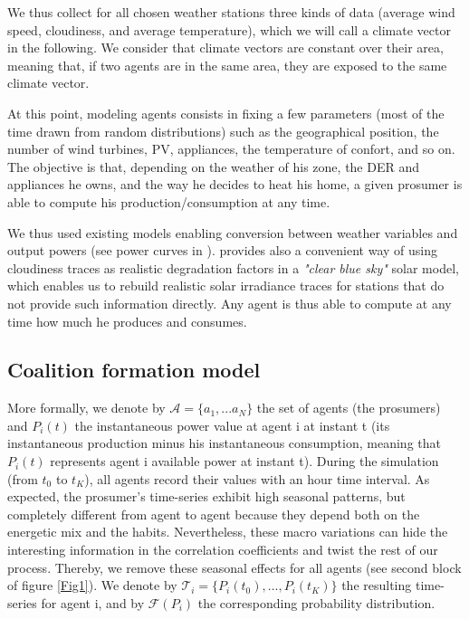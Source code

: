 \documentclass[conference]{IEEEtran}
\begin{document}
We thus collect for all chosen weather stations three kinds of data (average wind speed, cloudiness, and average temperature), which we will call a climate vector in the following. We consider that climate vectors are constant over their area, meaning that, if two agents are in the same area, they are exposed to the same climate vector.

At this point, modeling agents consists in fixing a few parameters (most of the time drawn from random distributions) such as the geographical position, the number of wind turbines, PV, appliances, the temperature of confort, and so on. The objective is that, depending on the weather of his zone, the DER and appliances he owns, and the way he decides to heat his home, a given prosumer is able to compute his production/consumption at any time. 

We thus used existing models enabling conversion between weather variables and output powers (see power curves in \cite{Kota2011} \cite{windturbinemodel}). \cite{Dans2007} provides also a convenient way of using cloudiness traces as realistic degradation factors in a \textit{"clear blue sky"} solar model, which enables us to rebuild realistic solar irradiance traces for stations that do not provide such information directly. Any agent is thus able to compute at any time how much he produces and consumes. 

\subsection{Coalition formation model}\label{subsec:Coalition}
More formally, we denote by $ \mathcal{A} = \{ a_{1},...a_{N} \} $ the set of agents (the prosumers) and $ P_{i}(t) $ the instantaneous power value at agent i at instant t (its instantaneous production minus his instantaneous consumption, meaning that $ P_{i}(t) $ represents agent i available power at instant t). During the simulation (from $t_{0} $ to $ t_{K} $), all agents record their values with an hour time interval. As expected, the prosumer's time-series exhibit high seasonal patterns, but completely different from agent to agent because they depend both on the energetic mix and the habits. Nevertheless, these macro variations can hide the interesting information in the correlation coefficients and twist the rest of our process. Thereby, we remove these seasonal effects for all agents (see second block of figure \ref{Fig1}). We denote by $ \mathcal{T}_{i} = \{ P_{i}(t_{0}),...,P_{i}(t_{K}) \} $ the resulting time-series for  agent i, and by $ \mathcal{F}(P_{i}) $ the corresponding probability distribution.
\end{document}
